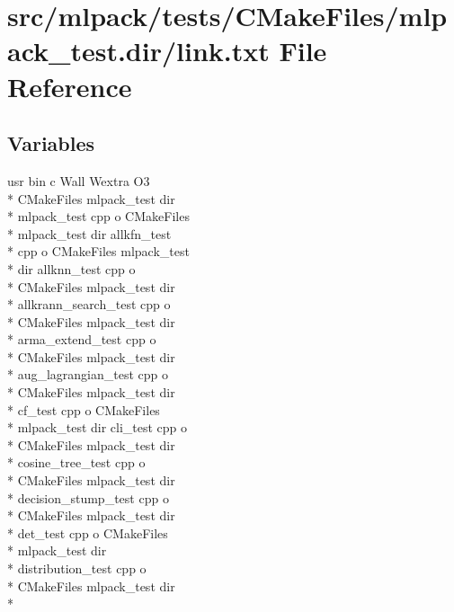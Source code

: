\section{src/mlpack/tests/\-C\-Make\-Files/mlpack\-\_\-test.dir/link.txt File Reference}
\label{tests_2CMakeFiles_2mlpack__test_8dir_2link_8txt}
\subsection*{Variables}
\begin{DoxyCompactItemize}
\item 
usr bin c Wall Wextra O3 \\*
C\-Make\-Files mlpack\-\_\-test dir \\*
mlpack\-\_\-test cpp o C\-Make\-Files \\*
mlpack\-\_\-test dir allkfn\-\_\-test \\*
cpp o C\-Make\-Files mlpack\-\_\-test \\*
dir allknn\-\_\-test cpp o \\*
C\-Make\-Files mlpack\-\_\-test dir \\*
allkrann\-\_\-search\-\_\-test cpp o \\*
C\-Make\-Files mlpack\-\_\-test dir \\*
arma\-\_\-extend\-\_\-test cpp o \\*
C\-Make\-Files mlpack\-\_\-test dir \\*
aug\-\_\-lagrangian\-\_\-test cpp o \\*
C\-Make\-Files mlpack\-\_\-test dir \\*
cf\-\_\-test cpp o C\-Make\-Files \\*
mlpack\-\_\-test dir cli\-\_\-test cpp o \\*
C\-Make\-Files mlpack\-\_\-test dir \\*
cosine\-\_\-tree\-\_\-test cpp o \\*
C\-Make\-Files mlpack\-\_\-test dir \\*
decision\-\_\-stump\-\_\-test cpp o \\*
C\-Make\-Files mlpack\-\_\-test dir \\*
det\-\_\-test cpp o C\-Make\-Files \\*
mlpack\-\_\-test dir \\*
distribution\-\_\-test cpp o \\*
C\-Make\-Files mlpack\-\_\-test dir \\*

\end{DoxyCompactItemize}
